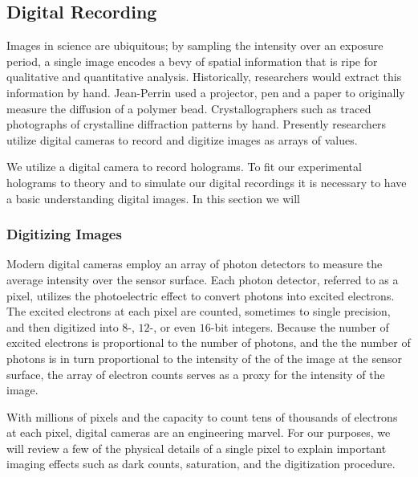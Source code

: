\subsection{Digital Recording}
\label{ch:hvm:sec:hvm:ssec:digitalrec}


Images in science are ubiquitous; by sampling the intensity over an exposure
period, a single image encodes a bevy of spatial information that is ripe
for qualitative and quantitative analysis. Historically, researchers would
extract this information by hand. Jean-Perrin used a projector, pen and a paper to originally
measure the diffusion of a polymer bead. Crystallographers such as %
traced photographs of crystalline diffraction patterns by hand. Presently researchers utilize
digital cameras to record and digitize images as arrays of values. 

We utilize a digital camera to record holograms. To fit our experimental holograms to
theory and to simulate our digital recordings it is necessary to have a basic
understanding digital images. In this section we will 

\subsubsection{Digitizing Images}
\label{ch:hvm:sec:hvm:ssec:digitalrec:sssec:digitizing}

Modern digital cameras employ an array of photon detectors to measure the
average intensity over the sensor surface. Each photon detector, referred to as a pixel,
utilizes the photoelectric effect to convert photons into excited electrons.
The excited electrons at each pixel are counted, sometimes to single precision, and
then digitized into $8$-, $12$-, or even $16$-bit integers. Because the number of
excited electrons is proportional to the number of photons, and the the number of
photons is in turn proportional to the intensity of the of the image at the
sensor surface, the array of electron counts serves as a proxy for the intensity
of the image.

With millions of pixels and the capacity to count tens of thousands of electrons at each pixel,
digital cameras are an engineering marvel. For our purposes, we will review a few of the physical
details of a single pixel to explain important imaging effects such as dark counts, saturation,
and the digitization procedure.

